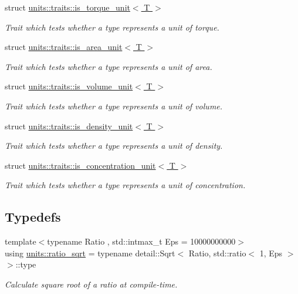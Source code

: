 \begin{DoxyCompactItemize}
struct \hyperlink{structunits_1_1traits_1_1is__torque__unit}{units\+::traits\+::is\+\_\+torque\+\_\+unit$<$ T $>$}
\begin{DoxyCompactList}\small\item\em Trait which tests whether a type represents a unit of torque. \end{DoxyCompactList}\item 
struct \hyperlink{structunits_1_1traits_1_1is__area__unit}{units\+::traits\+::is\+\_\+area\+\_\+unit$<$ T $>$}
\begin{DoxyCompactList}\small\item\em Trait which tests whether a type represents a unit of area. \end{DoxyCompactList}\item 
struct \hyperlink{structunits_1_1traits_1_1is__volume__unit}{units\+::traits\+::is\+\_\+volume\+\_\+unit$<$ T $>$}
\begin{DoxyCompactList}\small\item\em Trait which tests whether a type represents a unit of volume. \end{DoxyCompactList}\item 
struct \hyperlink{structunits_1_1traits_1_1is__density__unit}{units\+::traits\+::is\+\_\+density\+\_\+unit$<$ T $>$}
\begin{DoxyCompactList}\small\item\em Trait which tests whether a type represents a unit of density. \end{DoxyCompactList}\item 
struct \hyperlink{structunits_1_1traits_1_1is__concentration__unit}{units\+::traits\+::is\+\_\+concentration\+\_\+unit$<$ T $>$}
\begin{DoxyCompactList}\small\item\em Trait which tests whether a type represents a unit of concentration. \end{DoxyCompactList}\end{DoxyCompactItemize}
\subsection*{Typedefs}
\begin{DoxyCompactItemize}
\item 
{\footnotesize template$<$typename Ratio , std\+::intmax\+\_\+t Eps = 10000000000$>$ }\\using \hyperlink{group___type_traits_ga62dd90a825a801e3e29841ed51713693}{units\+::ratio\+\_\+sqrt} = typename detail\+::\+Sqrt$<$ Ratio, std\+::ratio$<$ 1, Eps $>$$>$\+::type
\begin{DoxyCompactList}\small\item\em Calculate square root of a ratio at compile-\/time. \end{DoxyCompactList}\end{DoxyCompactItemize}


